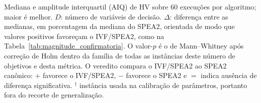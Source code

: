 \begin{table}[!htb]
\begin{tabular*}{\textwidth}{@{\extracolsep{\fill}}lrrrrrrrc@{}}
        \bottomrule
    \end{tabular*}
    \par\smallskip
    \parbox{\textwidth}{\footnotesize
    Mediana e amplitude interquartil (AIQ) de HV sobre 60 execuções por algoritmo; maior é melhor. $D$: número de variáveis de decisão. $\Delta$: diferença entre as medianas, em porcentagem da mediana do SPEA2, orientada de modo que valores positivos favoreçam o IVF/SPEA2, como na Tabela~\ref{tab:magnitude_confirmatoria}. O valor-$p$ é o de Mann--Whitney após correção de Holm dentro da família de todas as instâncias deste número de objetivos e desta métrica. O veredito compara o IVF/SPEA2 ao SPEA2 canônico: $+$ favorece o IVF/SPEA2, $-$ favorece o SPEA2 e $=$ indica ausência de diferença significativa. $^{\dagger}$ instância usada na calibração de parâmetros, portanto fora do recorte de generalização.
    }
\end{table}
